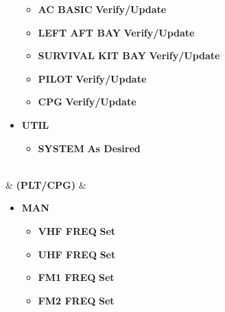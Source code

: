\documentclass[fontHelvetica]{TechCheck}
\begin{document}
\begin{listlongtable}
\begin{minipage}[t]{\linewidth}
\begin{itemize}
\begin{itemize}
					\item \textbf{AC BASIC} \dotfill \textbf{Verify/Update}
					\item \textbf{LEFT AFT BAY} \dotfill \textbf{Verify/Update}
					\item \textbf{SURVIVAL KIT BAY} \dotfill \textbf{Verify/Update}
					\item \textbf{PILOT} \dotfill \textbf{Verify/Update}
					\item \textbf{CPG} \dotfill \textbf{Verify/Update}
				\end{itemize}
				\item \textbf{UTIL}
				\begin{itemize}
					\item \textbf{SYSTEM} \dotfill \textbf{As Desired}
				\end{itemize}
			\end{itemize}
		\end{minipage} \\
		\midrule
		\textbf{\textbullet} &  \textbf{(PLT/CPG)} &
		\begin{minipage}[t]{\linewidth}
			\begin{itemize}
				\item \textbf{MAN}
				\begin{itemize}
					\item \textbf{VHF FREQ} \dotfill \textbf{Set}
					\item \textbf{UHF FREQ} \dotfill \textbf{Set}
					\item \textbf{FM1 FREQ} \dotfill \textbf{Set}
					\item \textbf{FM2 FREQ} \dotfill \textbf{Set}
				\end{itemize}
			\end{itemize}
		\end{minipage} \\
	\end{listlongtable}

\end{document}

